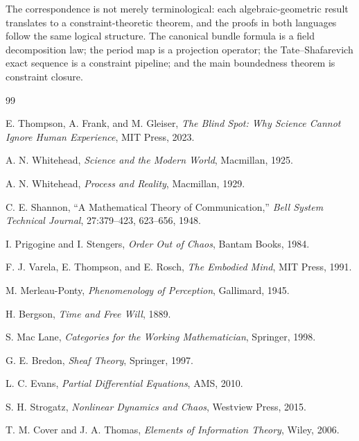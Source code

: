 \documentclass[11pt,openany]{book}
\begin{document}
The correspondence is not merely terminological: each
algebraic-geometric result translates to a constraint-theoretic
theorem, and the proofs in both languages follow the same
logical structure.  The canonical bundle formula is a
field decomposition law; the period map is a projection
operator; the Tate--Shafarevich exact sequence is a
constraint pipeline; and the main boundedness theorem is
constraint closure.


\backmatter


\begin{thebibliography}{99}

E. Thompson, A. Frank, and M. Gleiser,
\textit{The Blind Spot: Why Science Cannot Ignore Human Experience},
MIT Press, 2023.

A. N. Whitehead,
\textit{Science and the Modern World},
Macmillan, 1925.

A. N. Whitehead,
\textit{Process and Reality},
Macmillan, 1929.

C. E. Shannon,
``A Mathematical Theory of Communication,''
\textit{Bell System Technical Journal}, 27:379--423, 623--656, 1948.

I. Prigogine and I. Stengers,
\textit{Order Out of Chaos},
Bantam Books, 1984.

F. J. Varela, E. Thompson, and E. Rosch,
\textit{The Embodied Mind},
MIT Press, 1991.

M. Merleau-Ponty,
\textit{Phenomenology of Perception},
Gallimard, 1945.

H. Bergson,
\textit{Time and Free Will},
1889.

S. Mac Lane,
\textit{Categories for the Working Mathematician},
Springer, 1998.

G. E. Bredon,
\textit{Sheaf Theory},
Springer, 1997.

L. C. Evans,
\textit{Partial Differential Equations},
AMS, 2010.

S. H. Strogatz,
\textit{Nonlinear Dynamics and Chaos},
Westview Press, 2015.

T. M. Cover and J. A. Thomas,
\textit{Elements of Information Theory},
Wiley, 2006.


\end{thebibliography}
\end{document}

